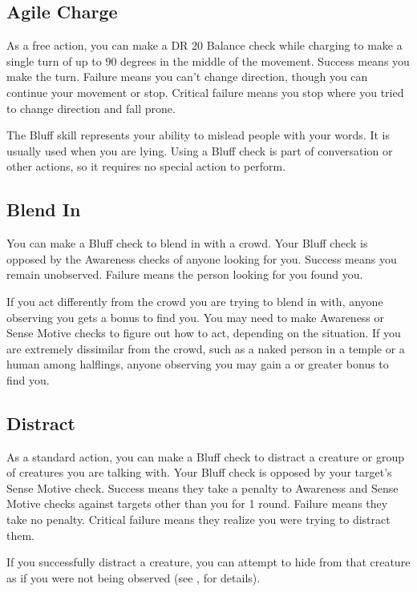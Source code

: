     \subsection{Agile Charge}
        As a free action, you can make a DR 20 Balance check while charging to make a single turn of up to 90 degrees in the middle of the movement. Success means you make the turn. Failure means you can't change direction, though you can continue your movement or stop. Critical failure means you stop where you tried to change direction and fall prone.

        The Bluff skill represents your ability to mislead people with your words. It is usually used when you are lying. Using a Bluff check is part of conversation or other actions, so it requires no special action to perform.

    \subsection{Blend In}
        You can make a Bluff check to blend in with a crowd. Your Bluff check is opposed by the Awareness checks of anyone looking for you. Success means you remain unobserved. Failure means the person looking for you found you.

        If you act differently from the crowd you are trying to blend in with, anyone observing you gets a  bonus to find you. You may need to make Awareness or Sense Motive checks to figure out how to act, depending on the situation. If you are extremely dissimilar from the crowd, such as a naked person in a temple or a human among halflings, anyone observing you may gain a  or greater bonus to find you.

    \subsection{Distract}
        As a standard action, you can make a Bluff check to distract a creature or group of creatures you are talking with. Your Bluff check is opposed by your target's Sense Motive check. Success means they take a  penalty to Awareness and Sense Motive checks against targets other than you for 1 round. Failure means they take no penalty. Critical failure means they realize you were trying to distract them.

        If you successfully distract a creature, you can attempt to hide from that creature as if you were not being observed (see , for details).

